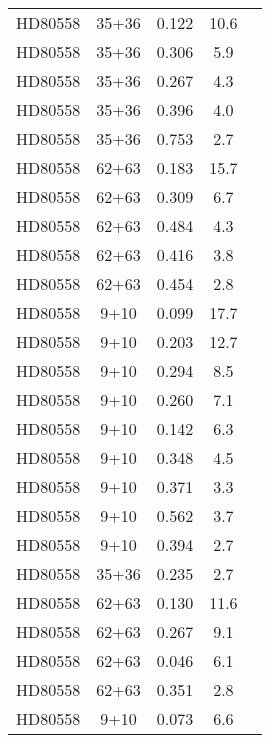 \begin{table*}
\begin{tabular}{l c c c c}
HD80558 & 35+36 & 0.122 & 10.6\\ 
HD80558 & 35+36 & 0.306 & 5.9\\ 
HD80558 & 35+36 & 0.267 & 4.3\\ 
HD80558 & 35+36 & 0.396 & 4.0\\ 
HD80558 & 35+36 & 0.753 & 2.7\\ 
HD80558 & 62+63 & 0.183 & 15.7\\ 
HD80558 & 62+63 & 0.309 & 6.7\\ 
HD80558 & 62+63 & 0.484 & 4.3\\ 
HD80558 & 62+63 & 0.416 & 3.8\\ 
HD80558 & 62+63 & 0.454 & 2.8\\ 
HD80558 & 9+10 & 0.099 & 17.7\\ 
HD80558 & 9+10 & 0.203 & 12.7\\ 
HD80558 & 9+10 & 0.294 & 8.5\\ 
HD80558 & 9+10 & 0.260 & 7.1\\ 
HD80558 & 9+10 & 0.142 & 6.3\\ 
HD80558 & 9+10 & 0.348 & 4.5\\ 
HD80558 & 9+10 & 0.371 & 3.3\\ 
HD80558 & 9+10 & 0.562 & 3.7\\ 
HD80558 & 9+10 & 0.394 & 2.7\\ 
HD80558 & 35+36 & 0.235 & 2.7\\ 
HD80558 & 62+63 & 0.130 & 11.6\\ 
HD80558 & 62+63 & 0.267 & 9.1\\ 
HD80558 & 62+63 & 0.046 & 6.1\\ 
HD80558 & 62+63 & 0.351 & 2.8\\ 
HD80558 & 9+10 & 0.073 & 6.6\\ 
\hline
\hline
\end{tabular}
\end{table*}